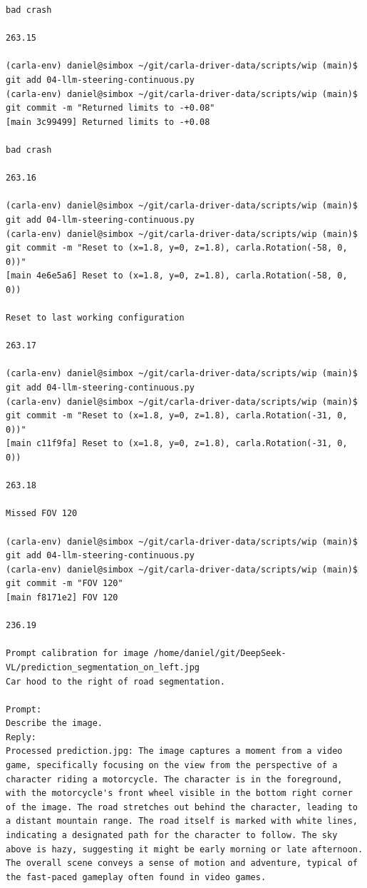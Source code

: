 \begin{verbatim}
bad crash

263.15

(carla-env) daniel@simbox ~/git/carla-driver-data/scripts/wip (main)$ git add 04-llm-steering-continuous.py 
(carla-env) daniel@simbox ~/git/carla-driver-data/scripts/wip (main)$ git commit -m "Returned limits to -+0.08"
[main 3c99499] Returned limits to -+0.08

bad crash

263.16

(carla-env) daniel@simbox ~/git/carla-driver-data/scripts/wip (main)$ git add 04-llm-steering-continuous.py 
(carla-env) daniel@simbox ~/git/carla-driver-data/scripts/wip (main)$ git commit -m "Reset to (x=1.8, y=0, z=1.8), carla.Rotation(-58, 0, 0))"
[main 4e6e5a6] Reset to (x=1.8, y=0, z=1.8), carla.Rotation(-58, 0, 0))

Reset to last working configuration

263.17

(carla-env) daniel@simbox ~/git/carla-driver-data/scripts/wip (main)$ git add 04-llm-steering-continuous.py 
(carla-env) daniel@simbox ~/git/carla-driver-data/scripts/wip (main)$ git commit -m "Reset to (x=1.8, y=0, z=1.8), carla.Rotation(-31, 0, 0))"
[main c11f9fa] Reset to (x=1.8, y=0, z=1.8), carla.Rotation(-31, 0, 0))

263.18

Missed FOV 120

(carla-env) daniel@simbox ~/git/carla-driver-data/scripts/wip (main)$ git add 04-llm-steering-continuous.py 
(carla-env) daniel@simbox ~/git/carla-driver-data/scripts/wip (main)$ git commit -m "FOV 120"
[main f8171e2] FOV 120

236.19

Prompt calibration for image /home/daniel/git/DeepSeek-VL/prediction_segmentation_on_left.jpg
Car hood to the right of road segmentation.

Prompt:
Describe the image.
Reply:
Processed prediction.jpg: The image captures a moment from a video game, specifically focusing on the view from the perspective of a character riding a motorcycle. The character is in the foreground, with the motorcycle's front wheel visible in the bottom right corner of the image. The road stretches out behind the character, leading to a distant mountain range. The road itself is marked with white lines, indicating a designated path for the character to follow. The sky above is hazy, suggesting it might be early morning or late afternoon. The overall scene conveys a sense of motion and adventure, typical of the fast-paced gameplay often found in video games.


\end{verbatim}
